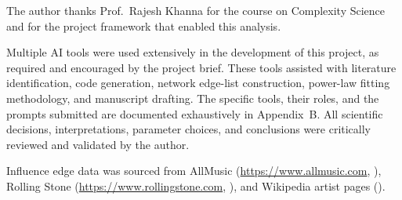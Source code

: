 \documentclass[12pt, a4paper]{article}
\begin{document}
The author thanks Prof.\ Rajesh Khanna for the course on
Complexity Science and for the project framework that enabled
this analysis.

Multiple AI tools were used extensively in the development of
this project, as required and encouraged by the project brief.
These tools assisted with literature identification, code
generation, network edge-list construction, power-law fitting
methodology, and manuscript drafting.
The specific tools, their roles, and the prompts submitted are
documented exhaustively in Appendix~B.
All scientific decisions, interpretations, parameter choices,
and conclusions were critically reviewed and validated by the
author.

Influence edge data was sourced from AllMusic
(\url{https://www.allmusic.com}, \citealt{allmusic2024}),
Rolling Stone (\url{https://www.rollingstone.com},
\citealt{rollingstoneartists}), and Wikipedia artist pages
(\citealt{wikifluence2024}).
\end{document}
